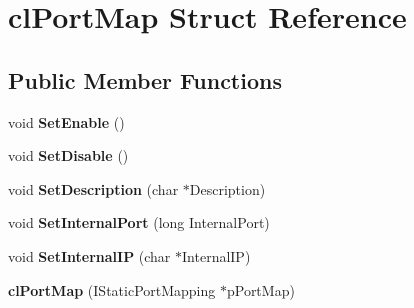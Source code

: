 \hypertarget{structcl_port_map}{
\section{clPortMap Struct Reference}
\label{structcl_port_map}
}
\subsection*{Public Member Functions}
\begin{DoxyCompactItemize}
\item 
\hypertarget{structcl_port_map_ad58a52ac3421c3b2a6d2d9964be165fb}{
void {\bfseries SetEnable} ()}
\label{structcl_port_map_ad58a52ac3421c3b2a6d2d9964be165fb}

\item 
\hypertarget{structcl_port_map_a7c61f195cc922ee00c642bfbec19cfac}{
void {\bfseries SetDisable} ()}
\label{structcl_port_map_a7c61f195cc922ee00c642bfbec19cfac}

\item 
\hypertarget{structcl_port_map_a50e264c67da5dd3059d2dfe9161e2111}{
void {\bfseries SetDescription} (char $\ast$Description)}
\label{structcl_port_map_a50e264c67da5dd3059d2dfe9161e2111}

\item 
\hypertarget{structcl_port_map_ada5df54db4a8b3cd0fb15f1dcbc34b7b}{
void {\bfseries SetInternalPort} (long InternalPort)}
\label{structcl_port_map_ada5df54db4a8b3cd0fb15f1dcbc34b7b}

\item 
\hypertarget{structcl_port_map_a1761ac46ce2c1b04ba1dadc641d147e2}{
void {\bfseries SetInternalIP} (char $\ast$InternalIP)}
\label{structcl_port_map_a1761ac46ce2c1b04ba1dadc641d147e2}

\item 
\hypertarget{structcl_port_map_a334c5c10d26d151881d3432d88e587ae}{
{\bfseries clPortMap} (IStaticPortMapping $\ast$pPortMap)}
\label{structcl_port_map_a334c5c10d26d151881d3432d88e587ae}

\end{DoxyCompactItemize}
